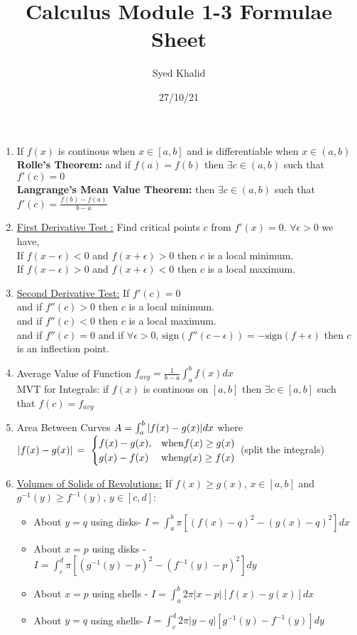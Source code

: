 \documentclass{article}
\title{\textbf{Calculus Module 1-3 Formulae Sheet}}
\author{Syed Khalid}
\date{27/10/21}
\begin{document}
\maketitle

\begin{enumerate}
    \item If $f(x)$ is continous when $x\in[a,b]$ and is differentiable when $x\in(a,b)$
        \\\textbf{Rolle's Theorem:} and if $f(a)=f(b)$ then
         $\exists c \in (a,b)$ such that $f'(c)=0$
        \\\textbf{Langrange's Mean Value Theorem:} then $\exists
         c \in (a,b)$ such that $f'(c)=\frac{f(b)-f(a)}{b-a}$
    \item \uline{First Derivative Test :} Find critical points $c$ from 
    $f'(x)=0$. $\forall \epsilon>0$ we have,\\
    If $f(x-\epsilon)<0$ and $f(x+\epsilon)>0 $ then $c$ is a local minimum.\\
    If $f(x-\epsilon)>0$ and $f(x+\epsilon)<0$ then $c$ is a local maximum.\\

    \item \uline{Second Derivative Test:} If $f'(c)=0$ \\
    and if $f''(c)>0$ then $c$ is a local minimum.\\
    and if $f''(c)<0$ then $c$ is a local maximum.\\
    and if $f''(c)=0$ and if  $\forall \epsilon>0,\,\text{sign}(f''(c-\epsilon))=-\text{sign}(f+\epsilon)$ then $c$ is an inflection point.
    
    \item Average Value of Function $f_{avg}=\frac{1}{b-a}\int_a^bf(x)dx$\\
    MVT for Integrals: if $f(x)$ is continous on $[a,b]$ then $\exists c\in[a,b]$ such that $f(c)=f_{avg}$
    
    \item Area Between Curves $A=\int^b_a\abs{f(x)-g(x)}dx$ where $\abs*{f(x)-g(x)}=\   \begin{cases}
        f(x)-g(x),& \text{when} f(x)\geq g(x)\\
        g(x)-f(x) & \text{when} g(x)\geq f(x)
    \end{cases}$ (split the integrals)
    
    \item \uline{Volumes of Solids of Revolutions:} If $f(x)\geq g(x),\, x\in [a,b]$ and $g^{-1}(y)\geq f^{-1}(y),\,y\in [c,d]$:
    \begin{itemize}
        \item About $y=q$ using disks- $I=\int_a^b\pi[(f(x)-q)^2-(g(x)-q)^2]dx$
        \item About $x=p$ using disks - $I=\int_c^d\pi[(g^{-1}(y)-p)^2-(f^{-1}(y)-p)^2]dy$
        \item About $x=p$ using shells - $I=\int_a^b2\pi|x-p|[f(x)-g(x)]dx$
        \item About $y=q$ using shells- $I=\int_c^d2\pi |y-q|[g^{-1}(y)-f^{-1}(y)]dy$


\end{itemize}
\end{enumerate}
\end{document}
